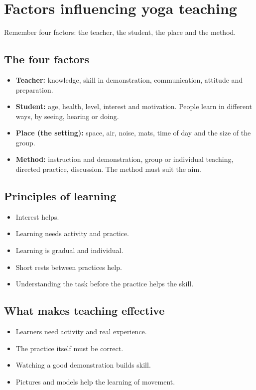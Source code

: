 \section{Factors influencing yoga teaching}

Remember four factors: the teacher, the student, the place and the method.

\subsection*{The four factors}

\begin{itemize}
\item \textbf{Teacher:} knowledge, skill in demonstration, communication, attitude and preparation.
\item \textbf{Student:} age, health, level, interest and motivation. People learn in different ways, by seeing, hearing or doing.
\item \textbf{Place (the setting):} space, air, noise, mats, time of day and the size of the group.
\item \textbf{Method:} instruction and demonstration, group or individual teaching, directed practice, discussion. The method must suit the aim.
\end{itemize}

\subsection*{Principles of learning}

\begin{itemize}
\item Interest helps.
\item Learning needs activity and practice.
\item Learning is gradual and individual.
\item Short rests between practices help.
\item Understanding the task before the practice helps the skill.
\end{itemize}

\subsection*{What makes teaching effective}

\begin{itemize}
\item Learners need activity and real experience.
\item The practice itself must be correct.
\item Watching a good demonstration builds skill.
\item Pictures and models help the learning of movement.
\end{itemize}

